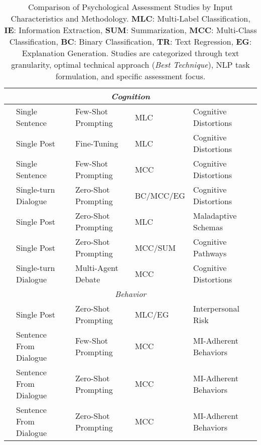 \begin{table*}[t!]
{\begin{tabular}{c p{3.75cm} p{3.5cm} p{2.25cm} p{3.75cm}}
         \midrule
         \multicolumn{5}{c}{\emph{Cognition}}\\
         \midrule
         \citet{5} & Single Sentence & Few-Shot Prompting & MLC & Cognitive Distortions \\
         \citet{10} & Single Post & Fine-Tuning & MLC & Cognitive Distortions \\
         \citet{12} & Single Sentence & Few-Shot Prompting & MCC & Cognitive Distortions \\
         \citet{14} & Single-turn Dialogue & Zero-Shot Prompting & BC/MCC/EG & Cognitive Distortions \\
         \citet{16} & Single Post & Zero-Shot Prompting & MLC & Maladaptive Schemas \\
         \citet{38} & Single Post & Zero-Shot Prompting & MCC/SUM & Cognitive Pathways \\
         \citet{45} & Single-turn Dialogue & Multi-Agent Debate & MCC & Cognitive Distortions \\

         \midrule
         \multicolumn{5}{c}{\emph{Behavior}}\\
         \midrule
         \citet{36} & Single Post & Zero-Shot Prompting & MLC/EG & Interpersonal Risk \\
         \citet{60} & Sentence From Dialogue & Few-Shot Prompting & MCC & MI-Adherent Behaviors \\
         \citet{65} & Sentence From Dialogue & Zero-Shot Prompting & MCC & MI-Adherent Behaviors \\
         \citet{67} & Sentence From Dialogue & Zero-Shot Prompting & MCC & MI-Adherent Behaviors \\
         

         \bottomrule
    \end{tabular}
    }
    \vspace{-5pt}
    \caption{Comparison of Psychological Assessment Studies by Input Characteristics and Methodology. \textbf{MLC}: Multi-Label Classification, \textbf{IE}: Information Extraction, \textbf{SUM}: Summarization, \textbf{MCC}: Multi-Class Classification, \textbf{BC}: Binary Classification, \textbf{TR}: Text Regression, \textbf{EG}: Explanation Generation. Studies are categorized through text granularity, optimal technical approach (\textit{Best Technique}), NLP task formulation, and specific assessment focus.}
    \vspace{-4mm}
    \label{tab:assessment_method_comparison}
\end{table*}

